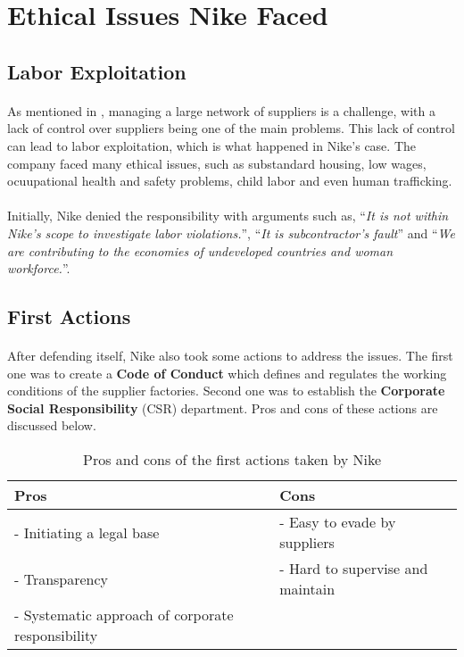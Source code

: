 \section{Ethical Issues Nike Faced}

\subsection{Labor Exploitation}

\paragraph{} As mentioned in \textsl{}, managing a large network of suppliers is a challenge, with a lack of control over suppliers being one of the main problems. This lack of control can lead to labor exploitation, which is what happened in Nike's case. The company faced many ethical issues, such as substandard housing, low wages, ocuupational health and safety problems, child labor and even human trafficking.

\paragraph{} Initially, Nike denied the responsibility with arguments such as, \enquote{\textit{It is not within Nike’s scope to investigate labor violations.}}, \enquote{\textit{It is subcontractor's fault}} and \enquote{\textit{We are contributing to the economies of undeveloped countries and woman workforce.}}. 

\subsection{First Actions}

\paragraph{} After defending itself, Nike also took some actions to address the issues. The first one was to create a \textbf{Code of Conduct} which defines and regulates the working conditions of the supplier factories. Second one was to establish the \textbf{Corporate Social Responsibility} (CSR) department. Pros and cons of these actions are discussed below.

\begin{table}[H]
    \centering
    \begin{tabular}{|l|l|}
        \hline
        Pros & Cons \\
        \hline
        - Initiating a legal base & - Easy to evade by suppliers \\
        - Transparency & - Hard to supervise and maintain \\
        - Systematic approach of corporate responsibility & \\
        \hline
    \end{tabular}
    \caption{Pros and cons of the first actions taken by Nike}
    \label{tab:first-actions}
\end{table}

